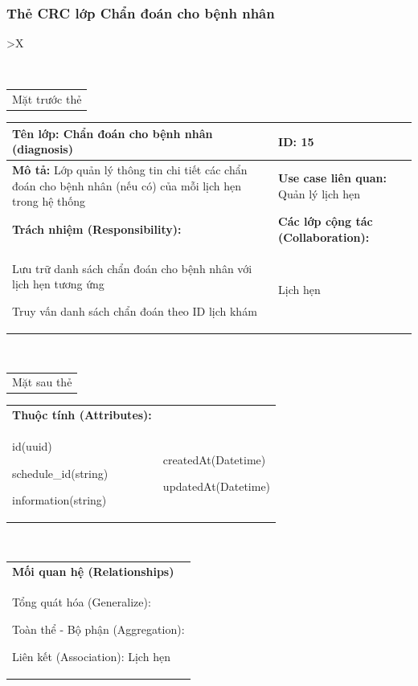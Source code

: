 \subsubsection{Thẻ CRC lớp Chẩn đoán cho bệnh nhân}

\begin{xltabular}{\textwidth}{
		>{\centering\arraybackslash}X
	}
	\caption{\bfseries \fontsize{12pt}{0pt}\selectfont Thẻ CRC lớp Chẩn đoán cho bệnh nhân}
	\\
	\begin{tabularx}{0.9\textwidth}{X}
		Mặt trước thẻ
	\end{tabularx}
	\begin{tabularx}{0.9\textwidth}{|X|X|}
		\hline
		\textbf{Tên lớp:} Chẩn đoán cho bệnh nhân (diagnosis)                                                               & \textbf{ID:} 15                                \\
		\hline
		\textbf{Mô tả:} Lớp quản lý thông tin chi tiết các chẩn đoán cho bệnh nhân (nếu có) của mỗi lịch hẹn trong hệ thống & \textbf{Use case liên quan:}  Quản lý lịch hẹn \\
		\hline
		\textbf{Trách nhiệm (Responsibility):}                                                                              & \textbf{Các lớp cộng tác (Collaboration):}     \\
		Lưu trữ danh sách chẩn đoán cho bệnh nhân với lịch hẹn tương ứng

		Truy vấn danh sách chẩn đoán theo ID lịch khám
		                                                                                                                    &
		Lịch hẹn
		\\
		\hline
	\end{tabularx}
	\\
	\begin{tabularx}{0.9\textwidth}{X}
		Mặt sau thẻ
	\end{tabularx}
	\begin{tabularx}{0.9\textwidth}{|X|X|}
		\hline
		\textbf{Thuộc tính (Attributes):} & \\
		id(uuid)

		schedule\_id(string)

		information(string)
		                                  &
		createdAt(Datetime)

		updatedAt(Datetime)
		\\ \hline
	\end{tabularx}
	\\
	\begin{tabularx}{0.9\textwidth}{|X|}
		\hline
		\textbf{Mối quan hệ (Relationships)} \\
		Tổng quát hóa (Generalize):

		Toàn thể - Bộ phận (Aggregation):

		Liên kết (Association): Lịch hẹn
		\\
		\hline
	\end{tabularx}
\end{xltabular}

